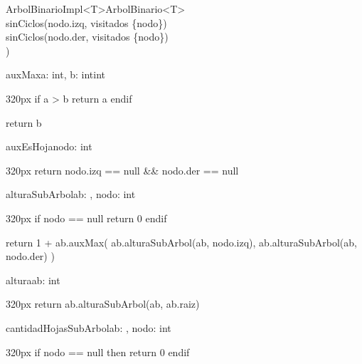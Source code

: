 \documentclass[10pt,a4paper]{article}
\begin{document}
\begin{ModuloImplements}{ArbolBinarioImpl<T>}{ArbolBinario<T>}
{      \\\Indent sinCiclos(nodo.izq, visitados \union \{nodo\}) \land
      \\\Indent sinCiclos(nodo.der, visitados \union \{nodo\})
    \\)
  }
  \vspace{1em}
  \begin{proc}{auxMax}{\In a: int, \In b: int}{int}
    \begin{ImplementationCode}{320px}
      if a > b
        return a
      endif

      return b
    \end{ImplementationCode}
  \end{proc}
  \begin{proc}{auxEsHoja}{\In nodo: }{int}
    \begin{ImplementationCode}{320px}
      return nodo.izq == null && nodo.der == null
    \end{ImplementationCode}
  \end{proc}
  \begin{proc}{alturaSubArbol}{\In ab: , \In nodo: }{int}
    \begin{ImplementationCode}{320px}
      if nodo == null
        return 0
      endif

      return 1 + ab.auxMax(
        ab.alturaSubArbol(ab, nodo.izq),
        ab.alturaSubArbol(ab, nodo.der)
      )
    \end{ImplementationCode}
  \end{proc}
  \begin{proc}{altura}{\In ab: }{int}
    \begin{ImplementationCode}{320px}
      return ab.alturaSubArbol(ab, ab.raiz)
    \end{ImplementationCode}
  \end{proc}
  \vspace{2em}
  \begin{proc}{cantidadHojasSubArbol}{\In ab: , \In nodo: }{int}
    \begin{ImplementationCode}{320px}
      if nodo == null then
        return 0
      endif


\end{ImplementationCode}
\end{proc}
\end{ModuloImplements}
\end{document}
